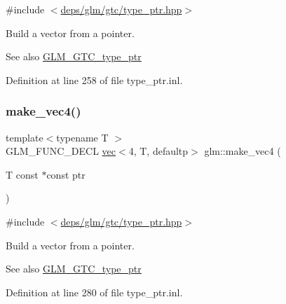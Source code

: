{\ttfamily \#include $<$\hyperlink{type__ptr_8hpp}{deps/glm/gtc/type\+\_\+ptr.\+hpp}$>$}

Build a vector from a pointer. \begin{DoxySeeAlso}{See also}
\hyperlink{group__gtc__type__ptr}{G\+L\+M\+\_\+\+G\+T\+C\+\_\+type\+\_\+ptr} 
\end{DoxySeeAlso}


Definition at line 258 of file type\+\_\+ptr.\+inl.

\mbox{\label{group__gtc__type__ptr_ga63f576518993efc22a969f18f80e29bb}} 
\subsubsection{\texorpdfstring{make\+\_\+vec4()}{make\_vec4()}\hspace{0.1cm}{\footnotesize\ttfamily [5/5]}}
{\footnotesize\ttfamily template$<$typename T $>$ \\
G\+L\+M\+\_\+\+F\+U\+N\+C\+\_\+\+D\+E\+CL \hyperlink{structglm_1_1vec}{vec}$<$4, T, defaultp$>$ glm\+::make\+\_\+vec4 (\begin{DoxyParamCaption}\item[{T const $\ast$const}]{ptr }\end{DoxyParamCaption})}



{\ttfamily \#include $<$\hyperlink{type__ptr_8hpp}{deps/glm/gtc/type\+\_\+ptr.\+hpp}$>$}

Build a vector from a pointer. \begin{DoxySeeAlso}{See also}
\hyperlink{group__gtc__type__ptr}{G\+L\+M\+\_\+\+G\+T\+C\+\_\+type\+\_\+ptr} 
\end{DoxySeeAlso}


Definition at line 280 of file type\+\_\+ptr.\+inl.

\mbox{\label{group__gtc__type__ptr_ga1c64669e1ba1160ad9386e43dc57569a}} 
